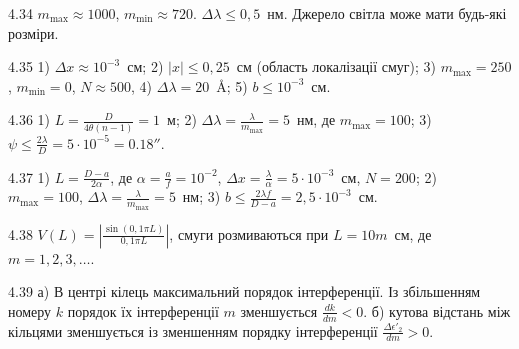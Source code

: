 \begin{Solution}{4.{34}}
	$ m_{\max} \approx 1000$, $ m_{\min} \approx 720 $. $ \Delta\lambda \le 0,5 $~нм. Джерело світла може мати будь-які розміри.
\end{Solution}
\begin{Solution}{4.{35}}
	1) $\Delta x \approx 10^{-3}$~см; 2) $|x| \le 0,25$~см (область локалізації смуг); 3) $ m_{\max} = 250$, $ m_{\min} = 0$, $N \approx 500$, 4) $\Delta\lambda = 20$~\AA; 5) $ b \le 10^{-3}$~см.
\end{Solution}
\begin{Solution}{4.{36}}
	1) $L = \frac{D}{4\theta (n - 1)} = 1$~м; 2) $ \Delta\lambda = \frac{\lambda}{m_{\max}} = 5$~нм, де $m_{\max} = 100$; 3) $\psi \le \frac{2\lambda}{D} = 5\cdot10^{-5} = 0.18''$.
\end{Solution}
\begin{Solution}{4.{37}}
	1) $L = \frac{D - a}{2\alpha}$, де $\alpha = \frac{a}{f} = 10^{-2}$, $ \Delta x  = \frac{\lambda}{\alpha} = 5\cdot10^{-3}$~см, $N = 200$; 2) $m_{\max} = 100$,  $ \Delta\lambda = \frac{\lambda}{m_{\max}} = 5$~нм; 3) $b \le \frac{2\lambda f}{D - a} = 2,5\cdot10^{-3}$~см.
\end{Solution}
\begin{Solution}{4.{38}}
	$V(L) = \left| \frac{\sin(0,1\pi L)}{0,1\pi L}\right|$, смуги розмиваються при $L = 10m$~см, де $m = 1, 2, 3, \ldots$.
\end{Solution}
\begin{Solution}{4.{39}}
	а) В центрі кілець максимальний порядок інтерференції. Із збільшенням номеру
	$k$ порядок їх інтерференції $ m $ зменшується $\frac{dk}{dm} < 0$. б) кутова відстань між кільцями зменшується із зменшенням порядку інтерференції  $\frac{\Delta \epsilon'_2}{dm} > 0 $.
\end{Solution}
